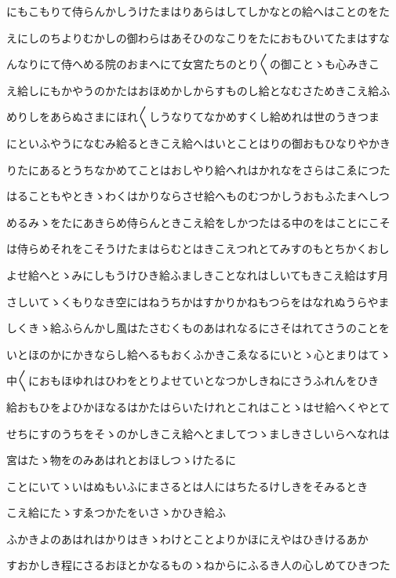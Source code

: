 \documentclass[a4paper,11pt,landscape]{ltjtarticle}
\begin{document}
\par\medskip
にもこもりて侍らんかしうけたまはりあらはしてしかなとの給へはことのをた
\par\medskip
えにしのちよりむかしの御わらはあそひのなこりをたにおもひいてたまはすな
\par\medskip
んなりにて侍へめる院のおまへにて女宮たちのとり〱の御ことゝも心みきこ
\par\medskip
え給しにもかやうのかたはおほめかしからすものし給となむさためきこえ給ふ
\par\medskip
めりしをあらぬさまにほれ〱しうなりてなかめすくし給めれは世のうきつま
\par\medskip
にといふやうになむみ給るときこえ給へはいとことはりの御おもひなりやかき
\par\medskip
りたにあるとうちなかめてことはおしやり給へれはかれなをさらはこゑにつた
\par\medskip
はることもやときゝわくはかりならさせ給へものむつかしうおもふたまへしつ
\par\medskip
めるみゝをたにあきらめ侍らんときこえ給をしかつたはる中のをはことにこそ
\par\medskip
は侍らめそれをこそうけたまはらむとはきこえつれとてみすのもとちかくおし
\par\medskip
よせ給へとゝみにしもうけひき給ふましきことなれはしいてもきこえ給はす月
\par\medskip
さしいてゝくもりなき空にはねうちかはすかりかねもつらをはなれぬうらやま
\par\medskip
しくきゝ給ふらんかし風はたさむくものあはれなるにさそはれてさうのことを
\par\medskip
いとほのかにかきならし給へるもおくふかきこゑなるにいとゝ心とまりはてゝ
\par\medskip
中〱におもほゆれはひわをとりよせていとなつかしきねにさうふれんをひき
\par\medskip
給おもひをよひかほなるはかたはらいたけれとこれはことゝはせ給へくやとて
\par\medskip
せちにすのうちをそゝのかしきこえ給へとましてつゝましきさしいらへなれは
\par\medskip
宮はたゝ物をのみあはれとおほしつゝけたるに
\par\medskip
ことにいてゝいはぬもいふにまさるとは人にはちたるけしきをそみるとき
\par\medskip
こえ給にたゝすゑつかたをいさゝかひき給ふ
\par\medskip
ふかきよのあはれはかりはきゝわけとことよりかほにえやはひきけるあか
\par\medskip
すおかしき程にさるおほとかなるものゝねからにふるき人の心しめてひきつた
\end{document}

